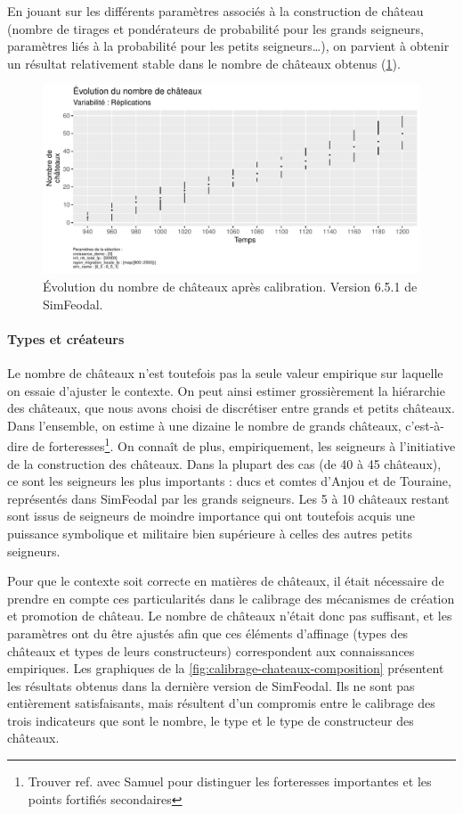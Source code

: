 En jouant sur les différents paramètres associés à la construction de château (nombre de tirages et pondérateurs de probabilité pour les grands seigneurs, paramètres liés à la probabilité pour les petits seigneurs\ldots), on parvient à obtenir un résultat relativement stable dans le nombre de châteaux obtenus (\cref{fig:calibrage-chateaux-nb}).

\begin{figure}[H]
	\centering
	\includegraphics[width=.9\linewidth]{img/results_6_5_1/Chateaux_Nb_Haut.pdf}
	\caption{Évolution du nombre de châteaux après calibration. Version 6.5.1 de SimFeodal.}
	\label{fig:calibrage-chateaux-nb}
\end{figure}

\paragraph{Types et créateurs}

Le nombre de châteaux n'est toutefois pas la seule valeur empirique sur laquelle on essaie d'ajuster le contexte.
On peut ainsi estimer grossièrement la hiérarchie des châteaux, que nous avons choisi de discrétiser entre grands et petits châteaux.
Dans l'ensemble, on estime à une dizaine le nombre de \og grands châteaux\fg{}, c'est-à-dire de \og forteresses\fg{}\footnote{
	Trouver ref. avec Samuel pour distinguer les \og forteresses importantes\fg{} et les \og points fortifiés secondaires\fg{}
}.
On connaît de plus, empiriquement, les seigneurs à l'initiative de la construction des châteaux.
Dans la plupart des cas (de 40 à 45 châteaux), ce sont les seigneurs les plus importants : ducs et comtes d'Anjou et de Touraine, représentés dans SimFeodal par les grands seigneurs.
Les 5 à 10 châteaux restant sont issus de seigneurs de moindre importance qui ont toutefois acquis une puissance symbolique et militaire bien supérieure à celles des autres petits seigneurs.

Pour que le contexte soit correcte en matières de châteaux, il était nécessaire de prendre en compte ces particularités dans le calibrage des mécanismes de création et promotion de château.
Le nombre de châteaux n'était donc pas suffisant, et les paramètres ont du être ajustés afin que ces éléments d'affinage (types des châteaux et types de leurs constructeurs) correspondent aux connaissances empiriques.
Les graphiques de la \cref{fig:calibrage-chateaux-composition} présentent les résultats obtenus dans la dernière version de SimFeodal.
Ils ne sont pas entièrement satisfaisants, mais résultent d'un compromis entre le calibrage des trois indicateurs que sont le nombre, le type et le type de constructeur des châteaux.

